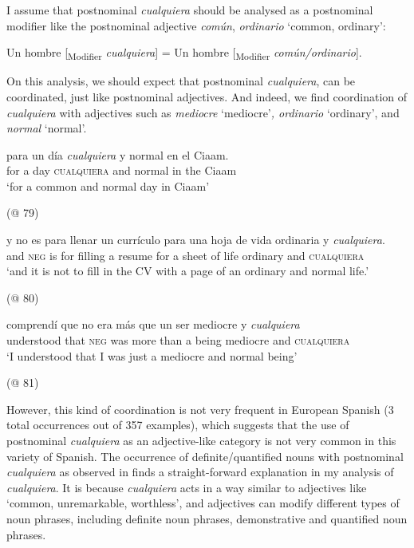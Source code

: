 {I assume that postnominal \textit{cualquiera} should be analysed as a postnominal modifier like the postnominal adjective \textit{común}, \textit{ordinario} ‘common, ordinary’:

\ea \label{ex:key:146} %
 Un hombre [\textsubscript{Modifier} \textit{cualquiera}] = Un hombre [\textsubscript{Modifier} \textit{común/ordinario}].
\z

On this analysis, we should expect that postnominal \textit{cualquiera}, can be coordinated, just like postnominal adjectives. And indeed, we find coordination of \textit{cualquiera} with adjectives such as \textit{mediocre} ‘mediocre’\textit{, ordinario} ‘ordinary’, and \textit{normal} ‘normal’.

\ea \label{ex:key:147} %
\gll  para un día \textit{cualquiera} y normal en el Ciaam.\\
for a day \textsc{cualquiera} and normal in the Ciaam\\
\glt ‘for a common and normal day in Ciaam’

  (@ 79)
\z

\ea \label{ex:key:148} %
\gll y no es para llenar un currículo para una hoja de vida ordinaria y \textit{cualquiera}.\\
and \textsc{neg} is for filling a resume for a sheet of life ordinary and \textsc{cualquiera}\\
\glt ‘and it is not to fill in the CV with a page of an ordinary and normal life.’

  (@ 80)
\z

\ea \label{ex:key:149} %
\gll comprendí que no era más que un ser mediocre y \textit{cualquiera}\\
understood that \textsc{neg} was more than a being mediocre and \textsc{cualquiera}\\
\glt ‘I understood that I was just a mediocre and normal being’

  (@ 81)
\z

However, this kind of coordination is not very frequent in European Spanish (3 total occurrences out of 357 examples), which suggests that the use of postnominal \textit{cualquiera} as an adjective-like category is not very common in this variety of Spanish. The occurrence of definite/quantified nouns with postnominal \textit{cualquiera} as observed in  finds a straight-forward explanation in my analysis of \textit{cualquiera}. It is because \textit{cualquiera} acts in a way similar to adjectives like ‘common, unremarkable, worthless’, and adjectives can modify different types of noun phrases, including definite noun phrases, demonstrative and quantified noun phrases.

}
